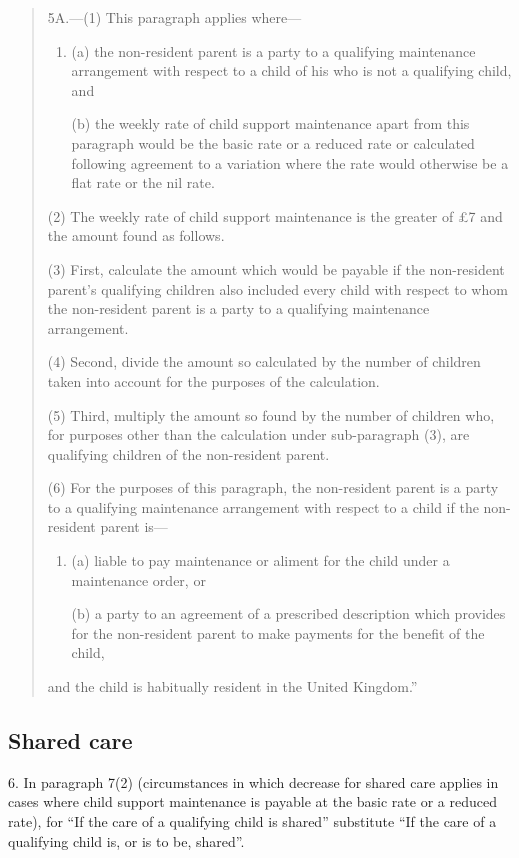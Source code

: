 \documentclass[a4paper]{article}
\begin{document}
{\begin{quotation}
5A.---(1) This paragraph applies where—
\begin{enumerate}\item[]
(a) the non-resident parent is a party to a qualifying maintenance arrangement with respect to a child of his who is not a qualifying child, and

(b) the weekly rate of child support maintenance apart from this paragraph would be the basic rate or a reduced rate or calculated following agreement to a variation where the rate would otherwise be a flat rate or the nil rate.
\end{enumerate}

(2) The weekly rate of child support maintenance is the greater of £7 and the amount found as follows.

(3) First, calculate the amount which would be payable if the non-resident parent's qualifying children also included every child with respect to whom the non-resident parent is a party to a qualifying maintenance arrangement.

(4) Second, divide the amount so calculated by the number of children taken into account for the purposes of the calculation.

(5) Third, multiply the amount so found by the number of children who, for purposes other than the calculation under sub-\hspace{0pt}paragraph (3), are qualifying children of the non-resident parent.

(6) For the purposes of this paragraph, the non-resident parent is a party to a qualifying maintenance arrangement with respect to a child if the non-resident parent is—
\begin{enumerate}\item[]
(a) liable to pay maintenance or aliment for the child under a maintenance order, or

(b) a party to an agreement of a prescribed description which provides for the non-resident parent to make payments for the benefit of the child,
\end{enumerate}
and the child is habitually resident in the United Kingdom.”
\end{quotation}

\subsection*{Shared care}

6. In paragraph 7(2) (circumstances in which decrease for shared care applies in cases where child support maintenance is payable at the basic rate or a reduced rate), for “If the care of a qualifying child is shared” substitute “If the care of a qualifying child is, or is to be, shared”.

}
\end{document}
